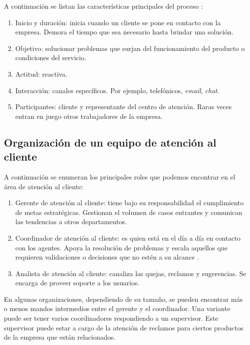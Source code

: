 A continuación se listan las características principales del proceso \citep{WEBSITE:3}:
\begin{enumerate}

\item Inicio y duración: inicia cuando un cliente se pone en contacto con la empresa. Demora el tiempo que sea necesario hasta brindar una solución.
\item Objetivo: solucionar problemas que surjan del funcionamiento del producto o condiciones del servicio.
\item Actitud: reactiva.
\item Interacción: canales específicos. Por ejemplo, telefónicos, \textit{email}, \textit{chat}.
\item Participantes: cliente y representante del centro de atención. Raras veces entran en juego otros trabajadores de la empresa.

\end{enumerate}

\subsection{Organización de un equipo de atención al cliente}

A continuación se enumeran los principales roles que podemos encontrar en el área de atención al cliente:

\begin{enumerate}

\item Gerente de atención al cliente: tiene bajo su responsabilidad el cumplimiento de metas estratégicas. Gestionan el volumen de casos entrantes y comunican las tendencias a otros departamentos. \citep{WEBSITE:6}
\item Coordinador de atención al cliente: es quien está en el día a día en contacto con los agentes. Apoya la resolución de problemas y escala aquellos que requieren validaciones o decisiones que no estén a su alcance \citep{WEBSITE:5}.
\item Analista de atención al cliente: canaliza las quejas, reclamos y sugerencias. Se encarga de proveer soporte a los usuarios. \citep{WEBSITE:5}

\end{enumerate}

En algunas organizaciones, dependiendo de su tamaño, se pueden encontrar más o menos mandos intermedios entre el gerente y el coordinador. Una variante puede ser tener varios coordinadores respondiendo a un supervisor. Este supervisor puede estar a cargo de la atención de reclamos para ciertos productos de la empresa que están relacionados.

